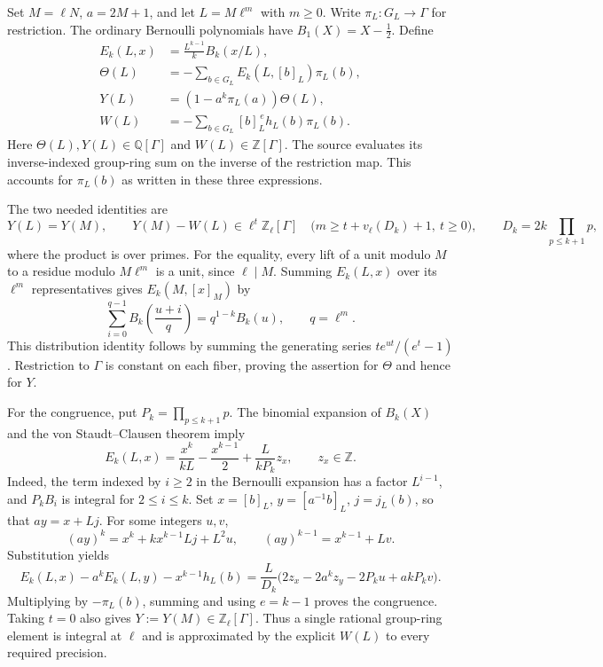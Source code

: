 Set \(M=\ell N\), \(a=2M+1\), and let \(L=M\ell^m\) with \(m\ge0\).
Write \(\pi_L:G_L\to\Gamma\) for restriction. The ordinary Bernoulli
polynomials have \(B_1(X)=X-\tfrac12\). Define
\begin{align*}
 E_k(L,x)&=\frac{L^{k-1}}{k} B_k(x/L),\\
 \Theta(L)&=-\sum_{b\in G_L} E_k(L,[b]_L)\pi_L(b),\\
 Y(L)&=(1-a^k\pi_L(a))\Theta(L),\\
 W(L)&=-\sum_{b\in G_L}[b]_L^{\,e}h_L(b)\pi_L(b).
\end{align*}
Here \(\Theta(L),Y(L)\in\mathbb Q[\Gamma]\) and
\(W(L)\in\mathbb Z[\Gamma]\).
The source evaluates its inverse-indexed group-ring sum on the
inverse of the restriction map. This accounts for \(\pi_L(b)\)
as written in these three expressions.

The two needed identities are
\[
 Y(L)=Y(M),\qquad
 Y(M)-W(L)\in\ell^t\mathbb Z_\ell[\Gamma]
 \quad\bigl(m\ge t+v_\ell(D_k)+1,\ t\ge0\bigr),
 \qquad
 D_k=2k\prod_{p\le k+1}p ,
\]
where the product is over primes. For the equality, every lift of
a unit modulo \(M\) to a residue modulo \(M\ell^m\) is a unit,
since \(\ell\mid M\). Summing \(E_k(L,x)\) over its \(\ell^m\)
representatives gives \(E_k(M,[x]_M)\) by
\[
 \sum_{i=0}^{q-1}B_k\!\left(\frac{u+i}{q}\right)
    =q^{1-k}B_k(u),\qquad q=\ell^m .
\]
This distribution identity follows by summing the generating series
\(te^{ut}/(e^t-1)\). Restriction to \(\Gamma\) is constant on each
fiber, proving the assertion for \(\Theta\) and hence for \(Y\).

For the congruence, put \(P_k=\prod_{p\le k+1}p\).
The binomial expansion of \(B_k(X)\) and the von Staudt--Clausen
theorem imply
\[
 E_k(L,x)=\frac{x^k}{kL}-\frac{x^{k-1}}2+
               \frac{L}{kP_k}z_x,\qquad z_x\in\mathbb Z .
\]
Indeed, the term indexed by \(i\ge2\) in the Bernoulli expansion has
a factor \(L^{i-1}\), and \(P_k B_i\) is integral for \(2\le i\le k\).
Set \(x=[b]_L\), \(y=[a^{-1}b]_L\), \(j=j_L(b)\), so that
\(ay=x+Lj\). For some integers \(u,v\),
\[
 (ay)^k=x^k+kx^{k-1}Lj+L^2u,\qquad
 (ay)^{k-1}=x^{k-1}+Lv.
\]
Substitution yields
\[
 E_k(L,x)-a^kE_k(L,y)-x^{k-1}h_L(b)
 =\frac{L}{D_k}
    \bigl(2z_x-2a^k z_y-2P_k u+akP_k v\bigr).
\]
Multiplying by \(-\pi_L(b)\), summing and using \(e=k-1\) proves
the congruence. Taking \(t=0\) also gives \(Y:=Y(M)\in
\mathbb Z_\ell[\Gamma]\). Thus a single rational group-ring element
is integral at \(\ell\) and is approximated by the explicit \(W(L)\)
to every required precision.

